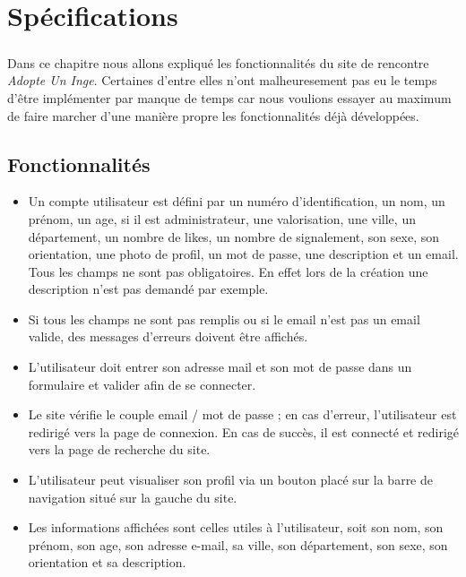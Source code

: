 \chapter{Spécifications}

\paragraph{}
Dans ce chapitre nous allons expliqué les fonctionnalités du site de rencontre \textit{Adopte Un Inge}. Certaines d'entre elles n'ont malheuresement pas eu le temps d'être implémenter par manque de temps car nous voulions essayer au maximum de faire marcher d'une manière propre les fonctionnalités déjà développées.
\section{Fonctionnalités}

\begin{itemize}
 \item Un compte utilisateur est défini par un numéro d'identification, un nom, un prénom, un age, si il est administrateur, une valorisation, une ville, un département, un nombre de likes, un nombre de signalement, son sexe, son orientation, une photo de profil, un mot de passe, une description et un email. Tous les champs ne sont pas obligatoires. En effet lors de la création une description n'est pas demandé par exemple.
 \item Si tous les champs ne sont pas remplis ou si le email n'est pas un email valide, des messages d'erreurs doivent être affichés.
\end{itemize}

\begin{itemize}
 \item L'utilisateur doit entrer son adresse mail et son mot de passe dans un formulaire et valider afin de se connecter.
 \item Le site vérifie le couple email / mot de passe ; en cas d'erreur, l'utilisateur est redirigé vers la page de connexion.
 En cas de succès, il est connecté et redirigé vers la page de recherche du site.
\end{itemize}

\begin{itemize}
 \item L'utilisateur peut visualiser son profil via un bouton placé sur la barre de navigation situé sur la gauche du site.
 \item Les informations affichées sont celles utiles à l'utilisateur, soit son nom, son prénom, son age, son adresse e-mail, sa ville, son département, son sexe, son orientation et sa description.
\end{itemize}

